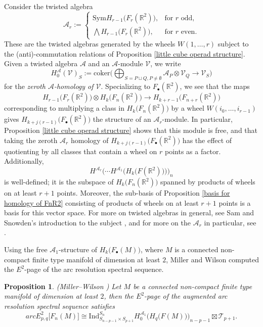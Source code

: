 \documentclass[pagebackref,colorlinks,citecolor=blue,linkcolor=blue,urlcolor=blue,filecolor=blue]{article}
\newtheorem{prop}[thm]{Proposition}
\theoremstyle{definition}\newtheorem{definition}[thm]{Definition}
\theoremstyle{definition}
\newcommand{\R}{\ensuremath{\mathbb{R}}}
\begin{document}
Consider the twisted algebra
\[
\mathcal{A}_{r}:=\begin{cases}
\text{Sym} H_{r-1}\big(F_{r}(\R^{2})\big),&\text{for } r \text{ odd,}\\
\bigwedge H_{r-1}\big(F_{r}(\R^{2})\big),&\text{for } r \text{ even}.
\end{cases}
\]
These are the twisted algebras generated by the wheels $W(1,\dots, r)$ subject to the (anti)-commutation relations of Proposition \ref{little cube operad structure}.
Given a twisted algebra $\mathcal{A}$ and an $\mathcal{A}$-module $\mathcal{V}$, we write
\[
H^{\mathcal{A}}_{0}(\mathcal{V})_{S}:=\text{coker}\bigg(\bigoplus_{S=P\sqcup Q, P\neq \emptyset}\mathcal{A}_{P}\otimes \mathcal{V}_{Q}\to \mathcal{V}_{S}\bigg)
\]
for the \emph{zeroth $\mathcal{A}$-homology of $\mathcal{V}$}.
Specializing to $F_{\bullet}(\R^{2})$, we see that the maps
\[
H_{r-1}\big(F_{r}(\R^{2})\big)\otimes H_{k}\big(F_{n}(\R^{2})\big)\to H_{k+r-1}\big(F_{n+r}(\R^{2})\big) 
\]
corresponding to multiplying a class in $H_{k}\big(F_{n}(\R^{2})\big)$ by a wheel $W(i_{0}, \dots, i_{r-1})$ gives $H_{k+j(r-1)}\big(F_{\bullet}(\R^{2})\big)$ the structure of an $\mathcal{A}_{r}$-module. 
In particular, Proposition \ref{little cube operad structure} shows that this module is free, and that taking the zeroth $\mathcal{A}_{r}$ homology of $H_{k+j(r-1)}\big(F_{\bullet}(\R^{2})\big)$ has the effect of quotienting by all classes that contain a wheel on $r$ points as a factor.
Additionally, 
\[
H^{\mathcal{A}_{r}}\bigg(\cdots H^{\mathcal{A}_{1}}\Big(H_{k}\big(F(\R^{2})\big)\Big)\bigg)_{n}
\]
is well-defined; it is the subspace of $H_{k}\big(F_{n}(\R^{2})\big)$ spanned by products of wheels on at least $r+1$ points.
Moreover, the sub-basis of Proposition \ref{basis for homology of FnR2} consisting of products of wheels on at least $r+1$ points is a basis for this vector space.
For more on twisted algebras in general, see Sam and Snowden's introduction to the subject \cite{sam2012introduction}, and for more on the $\mathcal{A}_{r}$ in particular, see \cite{church2017homology, nagpal2019noetherianity, miller2019higher}.

Using the free $\mathcal{A}_{1}$-structure of $H_{k}\big(F_{\bullet}(M)\big)$, where $M$ is a connected non-compact finite type manifold of dimension at least $2$, Miller and Wilson computed the $E^{2}$-page of the arc resolution spectral sequence.

\begin{prop}\label{E2pageforFnR2}
(Miller--Wilson \cite[Proposition 3.10]{miller2019higher})
Let $M$ be a connected non-compact finite type manifold of dimension at least $2$, then the $E^{2}$-page of the augmented arc resolution spectral sequence satisfies
\[
arcE^{2}_{p,q}\big[F_{n}(M)\big]\cong \text{Ind}^{S_{n}}_{S_{n-p-1}\times S_{p+1}}H^{\mathcal{A}_{1}}_{0}\Big(H_{q}\big(F(M)\big)\Big)_{n-p-1}\boxtimes \mathcal{T}_{p+1}.
\]
\end{prop}
\end{document}
